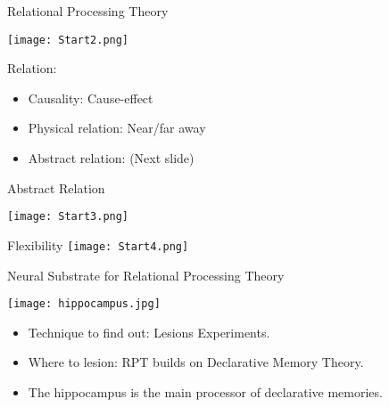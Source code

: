 \documentclass{beamer}
\begin{document}
\begin{frame}{Relational Processing Theory}

		\begin{minipage}{\linewidth}
		\centering
		\texttt{[image: Start2.png]}
			
		\end{minipage}

		\begin{minipage}{\linewidth}
		Relation:
		\begin{itemize}
			\item
				Causality: Cause-effect
			\item
				Physical relation: Near/far away
			\item
				Abstract relation: (Next slide)
			
		\end{itemize}

		\end{minipage}
	
\end{frame}

\begin{frame}{Abstract Relation}
		\begin{minipage}{\linewidth}
		\centering
		\texttt{[image: Start3.png]}
		\end{minipage}
\end{frame}

\begin{frame}{Flexibility}
		\centering
		\texttt{[image: Start4.png]}
	
\end{frame}

\begin{frame}{Neural Substrate for Relational Processing Theory}
		\begin{minipage}{0.4\linewidth}
				\centering
				\texttt{[image: hippocampus.jpg]}
		\end{minipage}
		\begin{minipage}{0.5\linewidth}
\hfill
		\begin{itemize}
			\item
				Technique to find out: Lesions Experiments.
			\item
				Where to lesion: RPT builds on Declarative Memory Theory. 
			\item 
				The hippocampus is the main processor of declarative memories.
		\end{itemize}
		\end{minipage}
\end{frame}
\end{document}
